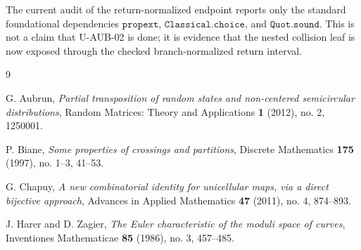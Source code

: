 \documentclass[11pt]{article}
\theoremstyle{plain}
\theoremstyle{definition}
\theoremstyle{remark}
\begin{document}
The current audit of the return-normalized endpoint reports only the
standard foundational dependencies \(\texttt{propext}\),
\(\texttt{Classical.choice}\), and \(\texttt{Quot.sound}\).  This is not a
claim that U-AUB-02 is done; it is evidence that the nested collision leaf is
now exposed through the checked branch-normalized return interval.

\begin{thebibliography}{9}

G. Aubrun,
\emph{Partial transposition of random states and non-centered semicircular
distributions},
Random Matrices: Theory and Applications \textbf{1} (2012), no. 2, 1250001.

P. Biane,
\emph{Some properties of crossings and partitions},
Discrete Mathematics \textbf{175} (1997), no. 1--3, 41--53.

G. Chapuy,
\emph{A new combinatorial identity for unicellular maps, via a direct
bijective approach},
Advances in Applied Mathematics \textbf{47} (2011), no. 4, 874--893.

J. Harer and D. Zagier,
\emph{The Euler characteristic of the moduli space of curves},
Inventiones Mathematicae \textbf{85} (1986), no. 3, 457--485.

\end{thebibliography}
\end{document}
